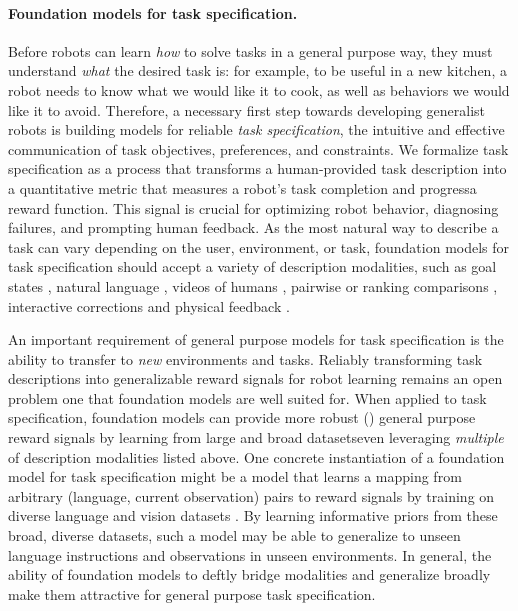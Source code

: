 \paragraph{Foundation models for task specification.} Before robots can learn \textit{how} to solve tasks in a general purpose way, they must understand \textit{what} the desired task is: for example, to be useful in a new kitchen, a robot needs to know what we would like it to cook, as well as behaviors we would like it to avoid. Therefore, a necessary first step towards developing generalist robots is building models for reliable \textit{task specification}, \ie the intuitive and effective communication of task objectives, preferences, and constraints. We formalize task specification as a process that transforms a human-provided task description into a quantitative metric that measures a robot’s task completion and progress\dash{}\eg a reward function. This signal is crucial for optimizing robot behavior, diagnosing failures, and prompting human feedback. As the most natural way to describe a task can vary depending on the user, environment, or task, foundation models for task specification should accept a variety of description modalities, such as goal states \citep{fu2018variational, singh2019endtoend}, natural language \citep{macglashan2015grounding, karamcheti2017draggns, misra2017mapping, coreyes2019guiding, shao2020concept2robot}, videos of humans \citep{shao2020concept2robot, chen2021generalizable, liu2018imitation}, pairwise or ranking comparisons \citep{biyik2018batch}, interactive corrections \citep{coreyes2019guiding, karamcheti2020decomposition} and physical feedback \citep{ross2011reduction, bajcsy2017learning}.

An important requirement of general purpose models for task specification is the ability to transfer to \textit{new} environments and tasks. Reliably transforming task descriptions into generalizable reward signals for robot learning remains an open problem \citep{taylor2016alignment}\dash{}one that foundation models are well suited for. When applied to task specification, foundation models can provide more robust () general purpose reward signals by learning from large and broad datasets\dash{}even leveraging \textit{multiple} of description modalities listed above. One concrete instantiation of a foundation model for task specification might be a model that learns a mapping from arbitrary (language, current observation) pairs to reward signals by training on diverse language and vision datasets \citep{bahdanau2019reward, fu2019lang2goals, chen2021generalizable}. By learning informative priors from these broad, diverse datasets, such a model may be able to generalize to unseen language instructions and observations in unseen environments. In general, the ability of foundation models to deftly bridge modalities and generalize broadly make them attractive for general purpose task specification.

